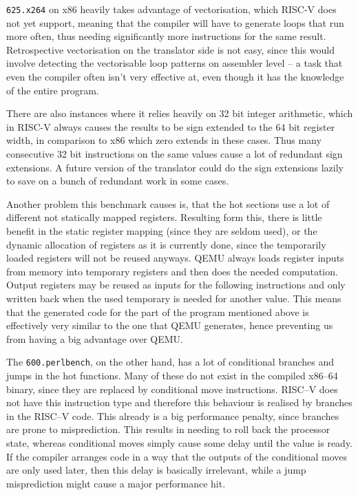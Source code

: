 \texttt{625.x264} on x86 heavily takes advantage of vectorisation, which RISC-V does not yet support, meaning that the compiler will have to generate loops that run more often, thus needing significantly more instructions for the same result.
Retrospective vectorisation on the translator side is not easy, since this would involve detecting the vectorisable loop patterns on assembler level -- a task that even the compiler often isn't very effective at, even though it has the knowledge of the entire program.

There are also instances where it relies heavily on 32 bit integer arithmetic, which in RISC-V always causes the results to be sign extended to the 64 bit register width, in comparison to x86 which zero extends in these cases.
Thus many consecutive 32 bit instructions on the same values cause a lot of redundant sign extensions.
A future version of the translator could do the sign extensions lazily to save on a bunch of redundant work in some cases.

Another problem this benchmark causes is, that the hot sections use a lot of different not statically mapped registers.
Resulting form this, there is little benefit in the static register mapping (since they are seldom used), or the dynamic allocation of registers as it is currently done, since the temporarily loaded registers will not be reused anyways.
QEMU always loads register inputs from memory into temporary registers and then does the needed computation.
Output registers may be reused as inputs for the following instructions and only written back when the used temporary is needed for another value.
This means that the generated code for the part of the program mentioned above is effectively very similar to the one that QEMU generates, hence preventing us from having a big advantage over QEMU\@.

The \texttt{600.perlbench}, on the other hand, has a lot of conditional branches and jumps in the hot functions.
Many of these do not exist in the compiled x86--64 binary, since they are replaced by conditional move instructions.
RISC--V does not have this instruction type and therefore this behaviour is realised by branches in the RISC--V code.
This already is a big performance penalty, since branches are prone to misprediction.
This results in needing to roll back the processor state, whereas conditional moves simply cause some delay until the value is ready.
If the compiler arranges code in a way that the outputs of the conditional moves are only used later, then this delay is basically irrelevant, while a jump misprediction might cause a major performance hit.

